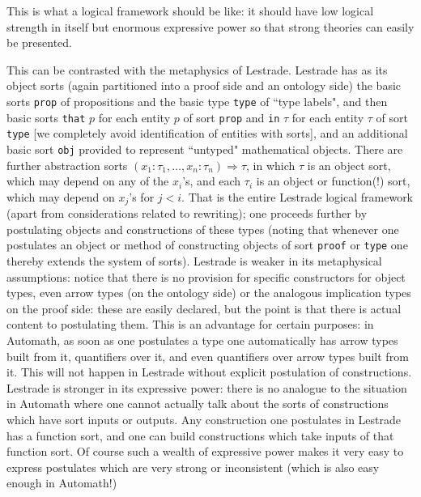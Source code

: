 \documentclass[12pt]{article}
\begin{document}
This is what a logical framework should be like:  it should have low logical strength in itself but enormous expressive power so that strong theories can easily be presented.

This can be contrasted with the metaphysics of Lestrade.  Lestrade has as its object sorts (again partitioned into a proof side and an ontology side) the basic sorts {\tt prop} of propositions
and the basic type {\tt type} of ``type labels", and then basic sorts {\tt that} $p$ for each entity $p$ of sort {\tt prop} and {\tt in} $\tau$ for each entity $\tau$ of sort {\tt type}
[we completely avoid identification of entities with sorts], and an additional basic sort {\tt obj} provided to represent ``untyped" mathematical objects.    There are further abstraction sorts
$(x_1:\tau_1,\ldots,x_n:\tau_n) \Rightarrow \tau$, in which $\tau$ is an object sort, which may depend on any of the $x_i$'s, and each $\tau_i$ is an object or function(!) sort, which may depend on $x_j$'s for $j<i$.  That is the entire Lestrade logical framework (apart from considerations related to rewriting);  one proceeds further by postulating objects and constructions of these types (noting that whenever one postulates an object or method of constructing objects of sort {\tt proof} or {\tt type} one thereby extends the system of sorts). Lestrade is weaker in its metaphysical assumptions:  notice that there is no provision for specific constructors for object types, even arrow types
(on the ontology side) or the analogous implication types on the proof side:  these are easily declared, but the point is that there is actual content to postulating them.  This is an advantage for certain purposes:  in Automath, as soon as one postulates a type one automatically has arrow types built from it, quantifiers over it, and even quantifiers over arrow types built from it.  This will not happen in Lestrade without explicit postulation of constructions.
Lestrade is stronger in its expressive power:  there is no analogue to the situation in Automath where one cannot actually talk about the sorts of constructions which have sort inputs or outputs.  Any construction one postulates in Lestrade has a function sort, and one can build constructions which take inputs of that function sort.  Of course such a wealth of expressive power makes it very easy to express postulates which are very strong or inconsistent (which is also easy enough in Automath!)
\end{document}
